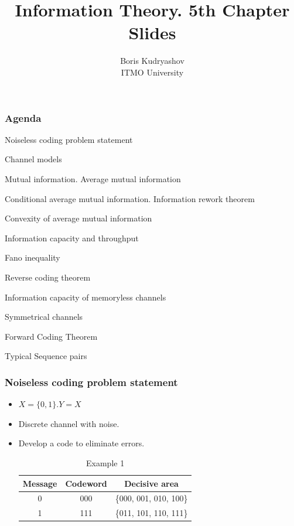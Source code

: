 \documentclass[14pt]{beamer}
\title{\small{Information Theory. 5th Chapter Slides}}
\author{\huge{
Boris Kudryashov \\
\vspace{30pt}
ITMO University
}}
\begin{document}
\maketitle

  

\begin{frame}
\frametitle{Agenda}
\begin{enumerate}
\small{
    \item{Noiseless coding problem statement}
    \item{Channel models}
    \item{Mutual information. Average mutual information}
    \item{Conditional average mutual information. Information rework theorem}
    \item{Convexity of average mutual information}
    \item{Information capacity and throughput}
    \item{Fano inequality}
    \item{Reverse coding theorem}
    \item{Information capacity of memoryless channels}
    \item{Symmetrical channels}
    \item{Forward Coding Theorem}
    \item{Typical Sequence pairs}
}

\end{enumerate}
\end{frame}


\begin{frame}
\frametitle{Noiseless coding problem statement}
\begin{itemize}

    \item $X=\{0, 1\}. Y = X$
    \item Discrete channel with noise.
    \item Develop a code to eliminate errors.
    
    
    \pause
    \begin{table}[htbp]
    \begin{center}
    \caption{Example 1}
    \begin{tabular}
        {|c|c|c|} \hline %
        Message & Codeword & Decisive area \\ \hline %
        0& 000&   {\{}000, 001, 010, 100{\}} \\ \hline %
        1& 111&   {\{}011, 101, 110, 111{\}} \\ \hline %
    \end{tabular}
    \end{center}
    \end{table}
    

\end{itemize}
\end{frame}
\end{document}
